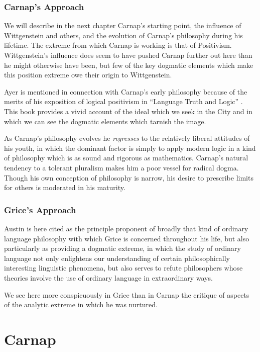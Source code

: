 \documentclass[10pt,titlepage]{book}
\begin{document}
\subsection{Carnap's Approach}

We will describe in the next chapter Carnap's starting point, the influence of Wittgenstein and others, and the evolution of Carnap's philosophy during his lifetime.
The extreme from which Carnap is working is that of Positivism.
Wittgenstein's influence does seem to have pushed Carnap further out here than he might otherwise have been, but few of the key dogmatic elements which make this position extreme owe their origin to Wittgenstein.

Ayer is mentioned in connection with Carnap's early philosophy because of the merits of his exposition of logical positivism in ``Language Truth and Logic'' \cite{ayer1936}.
This book provides a vivid account of the ideal which we seek in the City and in which we can see the dogmatic elements which tarnish the image.

As Carnap's philosophy evolves he \emph{regresses} to the relatively liberal attitudes of his youth, in which the dominant factor is simply to apply modern logic in a kind of philosophy which is as sound and rigorous as mathematics.
Carnap's natural tendency to a tolerant pluralism makes him a poor vessel for radical dogma.
Though his own conception of philosophy is narrow, his desire to prescribe limits for others is moderated in his maturity.

\subsection{Grice's Approach}

Austin is here cited as the principle proponent of broadly that kind of ordinary language philosophy with which Grice is concerned throughout his life, but also particularly as providing a dogmatic extreme, in which the study of ordinary language not only enlightens our understanding of certain philosophically interesting linguistic phenomena, but also serves to refute philosophers whose theories involve the use of ordinary language in extraordinary ways.

We see here more conspicuously in Grice than in Carnap the critique of aspects of the analytic extreme in which he was nurtured.

\chapter{Carnap}
\end{document}
